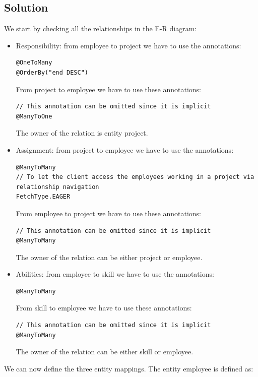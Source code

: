 \subsection*{Solution}
We start by checking all the relationships in the E-R diagram: 
\begin{itemize}
    \item Responsibility: from employee to project we have to use the annotations: 
        \begin{lstlisting}[style=Java]
@OneToMany
@OrderBy("end DESC")
        \end{lstlisting}
        From project to employee we have to use these annotations: 
        \begin{lstlisting}[style=Java]
// This annotation can be omitted since it is implicit
@ManyToOne
        \end{lstlisting}
        The owner of the relation is entity project. 
    \item Assignment: from project to employee we have to use the annotations: 
        \begin{lstlisting}[style=Java]
@ManyToMany
// To let the client access the employees working in a project via relationship navigation
FetchType.EAGER
        \end{lstlisting}
        From employee to project we have to use these annotations: 
        \begin{lstlisting}[style=Java]
// This annotation can be omitted since it is implicit
@ManyToMany
        \end{lstlisting}
        The owner of the relation can be either project or employee. 
    \item Abilities: from employee to skill we have to use the annotations: 
        \begin{lstlisting}[style=Java]
@ManyToMany
        \end{lstlisting}
        From skill to employee we have to use these annotations: 
        \begin{lstlisting}[style=Java]
// This annotation can be omitted since it is implicit
@ManyToMany
        \end{lstlisting}
        The owner of the relation can be either skill or employee. 
\end{itemize}
We can now define the three entity mappings. The entity employee is defined as:  
